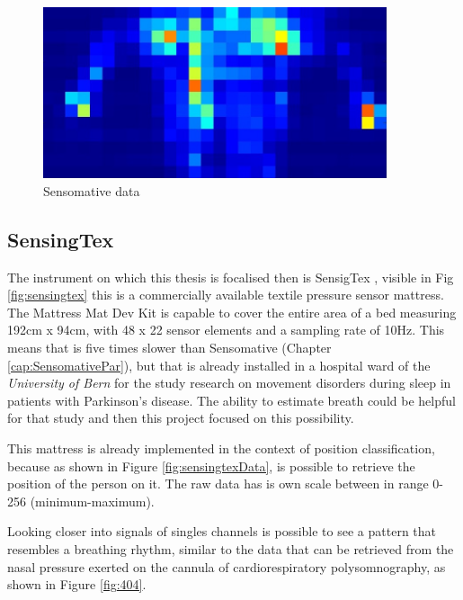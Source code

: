 \begin{figure}[H]
    \centering
    \includegraphics[width=0.9\textwidth]{img/sensomative_2.jpg}
    \caption{Sensomative data}
    \label{fig:sensomativeData}
\end{figure}
\vspace*{0.5cm}

\subsection{SensingTex} \label{cap:SensigTexPar}
The instrument on which this thesis is focalised then is SensigTex \cite{SensingConnectivity}, visible in Fig \ref{fig:sensingtex} this is a commercially available textile pressure sensor mattress. 
The Mattress Mat Dev Kit is capable to cover the entire area of a bed measuring 192cm x 94cm, with 48 x 22 sensor elements and a sampling rate of 10Hz. This means that is five times slower than Sensomative (Chapter \ref{cap:SensomativePar}), but that is already installed in a hospital ward of the \textit{University of Bern} for the study research on movement disorders during sleep in patients with Parkinson's disease. The ability to estimate breath could be helpful for that study and then this project focused on this possibility.

This mattress is already implemented in the context of position classification, because as shown in Figure \ref{fig:sensingtexData}, is possible to retrieve the position of the person on it. The raw data has is own scale between in range 0-256 (minimum-maximum). 

Looking closer into signals of singles channels is possible to see a pattern that resembles a breathing rhythm,  similar to the data that can
 be retrieved from the nasal pressure exerted on the cannula of cardiorespiratory polysomnography, as shown in Figure \ref{fig:404}.



